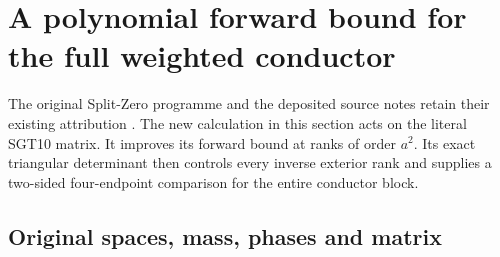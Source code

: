 \begingroup
\providecommand{\rank}{\operatorname{rank}}
\section{A polynomial forward bound for the full weighted conductor}
\label{sec:WCF}

The original Split-Zero programme and the deposited source notes retain
their existing attribution \cite{human:globalization2026,human:splitzero2026}.
The new calculation in this section acts on the literal SGT10 matrix. It
improves its forward bound at ranks of order $a^2$. Its exact triangular
determinant then controls every inverse exterior rank and supplies a
two-sided four-endpoint comparison for the entire conductor block.

\subsection{Original spaces, mass, phases and matrix}

